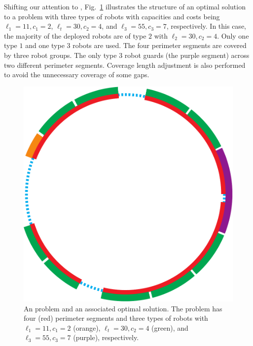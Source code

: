 Shifting our attention to \opgmc, Fig.~\ref{fig:opgext-opgmc} illustrates the 
structure of an optimal solution to a problem with three types of robots 
with capacities and costs being $\ell_1=11, c_1=2$, $\ell_t=30, 
c_2=4$, and $\ell_3=55, c_3=7$, respectively. In this case, the majority 
of the deployed robots are of type $2$ with $\ell_2=30, c_2=4$. Only one 
type $1$ and one type $3$ robots are used. The four perimeter segments are 
covered by three robot groups. 
%
%
The only type $3$ robot guards (the purple segment) across two different 
perimeter segments. Coverage length adjustment is also performed to avoid 
the unnecessary coverage of some gaps. 

\begin{figure}[!ht]
    \centering
    \includegraphics[scale = 0.4]{chapters/opg-ext/figures/opgmc-new-t-eps-converted-to.pdf}
    \caption{An \opgmc problem and an associated optimal solution. The 
		problem has four (red) perimeter segments and three types of robots
		with $\ell_1=11, c_1=2$ (orange), $\ell_t=30, c_2=4$ (green), 
		and $\ell_3=55, c_3=7$ (purple), respectively.}
		\label{fig:opgext-opgmc}
\end{figure}

